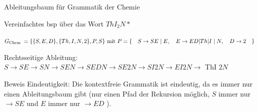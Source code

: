 \begin{minipage}{0.8\linewidth}
\begin{example2}{Ableitungsbaum für Grammatik der Chemie}

    Vereinfachtes bsp über das Wort $ThI_2N*$

    $G_{\text {Chem }}=\{\{S, E, D\},\{T h, I, N, 2\}, P, S\} \text { mit } P=\{ \\  \quad S \rightarrow S E \mid E, \\  \quad E \rightarrow E D|T h| I \mid N, \\  \quad D \rightarrow 2 \quad \}$

    \vspace{1mm}

    Rechtsseitige Ableitung: $S \rightarrow S E \rightarrow S N \rightarrow S E N \rightarrow S E D N \rightarrow S E 2 N \rightarrow S I 2 N \rightarrow E I 2 N \rightarrow$ ThI $2 N$

    \vspace{1mm}

    Beweis Eindeutigkeit: Die kontextfreie Grammatik ist eindeutig, da es immer nur einen Ableitungsbaum gibt (nur einen Pfad der Rekursion möglich, $S$ immer nur $\rightarrow S E$ und $E$ immer nur $\rightarrow E D$ ).
\end{example2}
\end{minipage}

